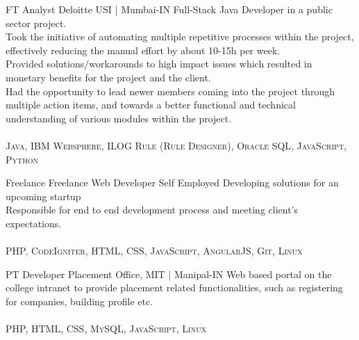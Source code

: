 \documentclass[10pt]{article} %
\begin{document}
\begin{paracol}{2}


{FT} %
{Analyst} %
{Deloitte USI | Mumbai-IN} %
{
\raisebox{-0.5pt}{\faAngleRight} Full-Stack Java Developer in a public sector project.\\
\raisebox{-0.5pt}{\faAngleRight} Took the initiative of automating multiple repetitive processes within the project, effectively reducing the manual effort by about 10-15h per week.\\
\raisebox{-0.5pt}{\faAngleRight} Provided solutions/workarounds to high impact issues which resulted in monetary benefits for the project and the client.\\
\raisebox{-0.5pt}{\faAngleRight} Had the opportunity to lead newer members coming into the project through multiple action items, and towards a better functional and technical understanding of various modules within the project.\\
\\
\textbf{\faCode} \textsc{Java, IBM Websphere, ILOG Rule (Rule Designer), Oracle SQL, JavaScript, Python}
} %


{Freelance} %
{Freelance Web Developer} %
{Self Employed} %
{
\raisebox{-0.5pt}{\faAngleRight} Developing solutions for an upcoming startup\\
\raisebox{-0.5pt}{\faAngleRight} Responsible for end to end development process and meeting client's expectations.\\
\\
\textbf{\faCode} \textsc{PHP, CodeIgniter, HTML, CSS, JavaScript, AngularJS, Git, Linux}
} %


{PT} %
{Developer} %
{Placement Office, MIT | Manipal-IN} %
{
\raisebox{-0.5pt}{\faAngleRight} Web based portal on the college intranet to provide placement related functionalities, such as registering for companies, building profile etc.\\
\\
\textbf{\faCode} \textsc{PHP, HTML, CSS, MySQL, JavaScript, Linux}
} %


\end{paracol}
\end{document}
